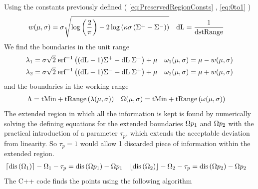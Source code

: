 Using the constants previously defined ( \ref{eq:PreservedRegionConsts} , \ref{eq:0to1} )
\begin{align*}
  w(\mu,\sigma)  & =  \sigma  \sqrt{ \log \left(\frac{2}{\pi } \right) -2 \log \left(\kappa \sigma  \left(\Sigma^+-\Sigma^-\right)\right) } &
  \text{dL} &= \frac{1}{\text{dstRange}} 
\end{align*}
We find the boundaries in the unit range 
\begin{equation}
\begin{aligned}
\lambda_1 &= \sigma \sqrt{2} \; \text{erf}^{-1}\left((\text{dL}-1) \Sigma^+-\text{dL} \; \Sigma^-\right)+\mu  &       
\omega_1(\mu,\sigma) &= \mu - w(\mu,\sigma)  \\     
\lambda_2 &= \sigma \sqrt{2} \; \text{erf}^{-1}\left((\text{dL}-1) \Sigma^- -\text{dL} \; \Sigma^+ \right)+\mu &
\omega_2(\mu,\sigma) &= \mu + w(\mu,\sigma) 
\end{aligned}
\end{equation}
and the boundaries in the working range
\begin{equation}
\begin{aligned}
\Lambda &= \text{tMin} + \text{tRange} \left( \lambda(\mu,\sigma) \right) & 
\Omega(\mu,\sigma) &= \text{tMin} + \text{tRange}\left( \omega(\mu,\sigma) \right) 
\end{aligned}
\end{equation}
The extended region in which all the information is kept is found by numerically solving the defining equations for the  extended boundaries $\Omega p_1$ and $\Omega p_2$ with the practical introduction of a parameter $ \tau_{p} $, which extends the acceptable deviation from linearity. So $ \tau_{p} =1$ would allow 1 discarded piece of information within the extended region.
\begin{equation}
\begin{aligned}
\left\lceil\text{dis}\left(\Omega _1\right)\right\rceil-\Omega _1 - \tau_{p} & =\text{dis}\left(\Omega p _1\right)- \Omega p _1 &
\left\lfloor\text{dis}\left(\Omega _2\right)\right\rfloor-\Omega _2 - \tau_{p} & =\text{dis}\left(\Omega p _2\right)- \Omega p _2 
\end{aligned}
\end{equation}
The C++ code finds the points using the following algorithm

